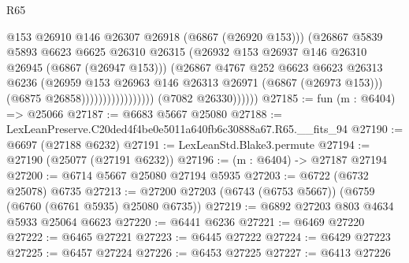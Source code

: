 \begin{lexlean}{R65}
\begin{coremodule}
{                                            @153
                                            @26910
                                            @146
                                            @26307
                                            @26918
                                            (@6867 (@26920 @153)))
                                          (@26867
                                            @5839
                                            @5893
                                            @6623
                                            @6625
                                            @26310
                                            @26315
                                            (@26932
                                              @153
                                              @26937
                                              @146
                                              @26310
                                              @26945
                                              (@6867 (@26947 @153)))
                                            (@26867
                                              @4767
                                              @252
                                              @6623
                                              @6623
                                              @26313
                                              @6236
                                              (@26959
                                                @153
                                                @26963
                                                @146
                                                @26313
                                                @26971
                                                (@6867 (@26973 @153)))
                                              (@6875 @26858)))))))))))))))))
              (@7082 @26330))))))
@27185 := fun (m : @6404) => @25066
@27187 := @6683 @5667 @25080
@27188 := LexLeanPreserve.C20ded4f4be0e5011a640fb6c30888a67.R65.__fits_94
@27190 := @6697 (@27188 @6232)
@27191 := LexLeanStd.Blake3.permute
@27194 := @27190 (@25077 (@27191 @6232))
@27196 := (m : @6404) -> @27187 @27194
@27200 := @6714 @5667 @25080 @27194 @5935
@27203 := @6722 (@6732 @25078) @6735
@27213 := @27200 @27203 (@6743 (@6753 @5667)) (@6759 (@6760 (@6761 @5935) @25080 @6735))
@27219 := @6892 @27203 @803 @4634 @5933 @25064 @6623
@27220 := @6441 @6236
@27221 := @6469 @27220
@27222 := @6465 @27221
@27223 := @6445 @27222
@27224 := @6429 @27223
@27225 := @6457 @27224
@27226 := @6453 @27225
@27227 := @6413 @27226
}
\end{coremodule}
\end{lexlean}
